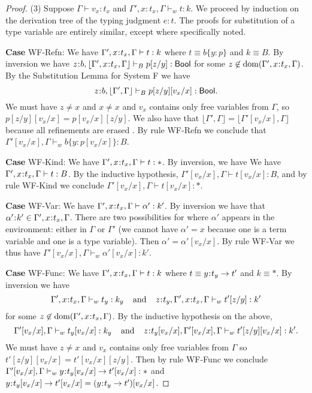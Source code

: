 \documentclass[11pt]{article}
\newcommand{\al}{\alpha}
\newcommand{\bind}{\hspace{0.05em}{:}\hspace{0.05em}} %
\newcommand{\col}{\mathbin{:}}       %
\newcommand{\Bool}{{\sf Bool}}
\newcommand{\functype}[3]{#1\bind #2 \rightarrow #3}
\newcommand{\dom}[1]{{\rm dom}(#1)}
\begin{document}
\begin{proof}
(3) Suppose $\Gamma \vdash v_x:t_x$ and $\Gamma', x:t_x ,\Gamma \vdash_w t : k$. We proceed by induction on the derivation tree of the typing judgment $e:t$. The proofs for substitution of a type variable are entirely similar, except where specifically noted.

{\bf Case} {\sc WF-Refn}: We have $\Gamma', x\bind t_x,\Gamma \vdash t: k$ where $t \equiv b\{y\col p\}$ and $k \equiv B$. By inversion we have $z\bind b, \lfloor \Gamma',x\bind t_x,\Gamma\rfloor \vdash_B p[z/y] : \Bool$ for some $z\not\in\dom{\Gamma',x\bind t_x,\Gamma}$. By the Substitution Lemma for System F we have
\[
z\bind b, \lfloor \Gamma', \Gamma\rfloor \vdash_B p[z/y][v_x/x] : \Bool.
\]
We must have $z\neq x$ and $x\neq x$ and $v_x$ contains only free variables from $\Gamma$, so $p[z/y][v_x/x] = p[v_x/x][z/y]$. We also have that $\lfloor \Gamma', \Gamma\rfloor = \lfloor \Gamma'[v_x/x], \Gamma\rfloor$ because all refinements are erased . By rule {\sc WF-Refn} we conclude that $\Gamma'[v_x/x], \Gamma \vdash_w b\{y\col p[v_x/x]\} : B$.

{\bf Case} {\sc WF-Kind}: We have $\Gamma', x\bind t_x,\Gamma \vdash t: *$. By inversion, we have We have $\Gamma', x\bind t_x,\Gamma \vdash t: B$. By the inductive hypothesis, $\Gamma'[v_x/x],\Gamma \vdash t[v_x/x]: B$, and by rule {\sc WF-Kind} we conclude $\Gamma'[v_x/x],\Gamma \vdash t[v_x/x]: *$.

{\bf Case} {\sc WF-Var}: We have $\Gamma', x\bind t_x,\Gamma \vdash \al' : k'$. By inversion we have that $\al'\bind k' \in \Gamma', x\bind t_x,\Gamma$. There are two possibilities for where $\al'$ appears in the environment: either in $\Gamma$ or $\Gamma'$ (we cannot have $\al'=x$ because one is a term variable and one is a type variable). Then $\al' = \al'[v_x/x]$. By rule {\sc WF-Var} we thus have $\Gamma'[v_x/x],\Gamma \vdash_w \al'[v_x/x] : k'$. 

{\bf Case} {\sc WF-Func}: We have $\Gamma', x\bind t_x,\Gamma \vdash t: k$ where $t \equiv \functype{y}{t_y}{t'}$ and $k \equiv *$. By inversion we have 
\begin{equation}
\Gamma', x\bind t_x,\Gamma \vdash_w t_y : k_y \;\;\;\;{\rm and}\;\;\;\; z\bind t_y,\Gamma', x\bind t_x,\Gamma \vdash_w t'[z/y] : k'
\end{equation}
for some $z\not\in\dom{\Gamma', x\bind t_x,\Gamma}$. By the inductive hypothesis on the above,
\begin{equation}
\Gamma'[v_x/x], \Gamma \vdash_w t_y[v_x/x] : k_y \;\;\;\;{\rm and}\;\;\;\;z\bind t_y[v_x/x],\Gamma'[v_x/x], \Gamma \vdash_w t'[z/y][v_x/x] : k'.
\end{equation}
We must have $z \neq x$ and $v_x$ contains only free variables from $\Gamma$ so $t'[z/y][v_x/x] = t'[v_x/x][z/y]$. Then by rule {\sc WF-Func} we conclude $\Gamma'[v_x/x], \Gamma \vdash_w \functype{y}{t_y[v_x/x]}{t'[v_x/x]} : *$ and $\functype{y}{t_y[v_x/x]}{t'[v_x/x]} = (\functype{y}{t_y}{t'})[v_x/x]$.


\end{proof}
\end{document}
